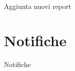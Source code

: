 \documentclass{article}
\begin{document}
Aggiunta nuovi report


\newpage
\section{Notifiche}

Notifiche












\end{document}
